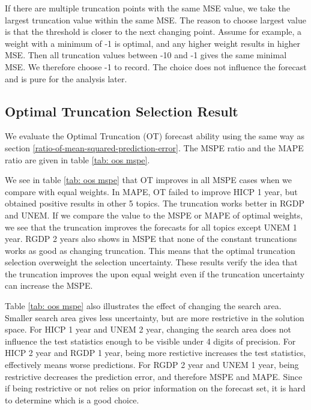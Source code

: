 \documentclass[11pt]{article}
\begin{document}
If there are
multiple truncation points with the same MSE value, we take the
largest truncation value within the same MSE. The reason to
choose largest value is that the threshold is closer to the next
changing point. Assume for example, a weight with a minimum of -1 is
optimal, and any higher weight results in higher MSE. Then all
truncation values between -10 and -1 gives the same minimal MSE. We
therefore choose -1 to record. The choice does not influence the
forecast and is pure for the analysis later.

\subsection{Optimal Truncation Selection Result}\label{out-of-sample-truncation-result}
We evaluate the Optimal Truncation (OT) forecast ability using the same way as section \ref{ratio-of-mean-squared-prediction-error}. The MSPE ratio and the MAPE ratio are given in table \ref{tab: oos mspe}.

We see in table \ref{tab: oos mspe} that OT improves in all
MSPE cases when we compare with equal weights. In MAPE, OT failed to improve HICP 1 year, but obtained positive results in other 5 topics. The truncation works better in RGDP and UNEM. If we compare the value to the MSPE or MAPE of optimal weights, we see that the truncation improves the forecasts for all topics except UNEM 1 year. RGDP 2 years also shows in MSPE that none of the constant truncations works as good as changing truncation. This means that the optimal truncation selection overweight the selection uncertainty. These results verify the idea that the truncation improves the upon equal weight even if the truncation uncertainty can increase the MSPE. 

Table \ref{tab: oos mspe} also illustrates the effect of changing the search area. Smaller search area gives less uncertainty, but are more restrictive in the solution space. For HICP 1 year and UNEM 2 year, changing the search area does not influence the test statistics enough to be visible under 4 digits of precision. For HICP 2 year and RGDP 1 year, being more restictive increases the test statistics, effectively means worse predictions. For RGDP 2 year and UNEM 1 year, being restrictive decreases the prediction error, and therefore MSPE and MAPE. Since if being restrictive or not relies on prior information on the forecast set, it is hard to determine which is a good choice.
\end{document}
